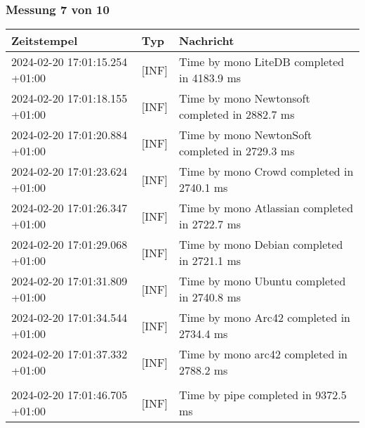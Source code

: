     \subsubsection*{Messung 7 von 10} \label{subsubsec:LiteDbWenigerPaketeAlsDb7von10}
        {
            {\small
                \begin{tabularx}{\textwidth}{|l|l|X|}
                    \hline
                    \textbf{Zeitstempel} & \textbf{Typ} & \textbf{Nachricht} \\
                    \hline
                    \endhead
                    2024-02-20 17:01:15.254 +01:00 & [INF] & Time by mono LiteDB completed in 4183.9 ms \\
                    2024-02-20 17:01:18.155 +01:00 & [INF] & Time by mono Newtonsoft completed in 2882.7 ms \\
                    2024-02-20 17:01:20.884 +01:00 & [INF] & Time by mono NewtonSoft completed in 2729.3 ms \\
                    2024-02-20 17:01:23.624 +01:00 & [INF] & Time by mono Crowd completed in 2740.1 ms \\
                    2024-02-20 17:01:26.347 +01:00 & [INF] & Time by mono Atlassian completed in 2722.7 ms \\
                    2024-02-20 17:01:29.068 +01:00 & [INF] & Time by mono Debian completed in 2721.1 ms \\
                    2024-02-20 17:01:31.809 +01:00 & [INF] & Time by mono Ubuntu completed in 2740.8 ms \\
                    2024-02-20 17:01:34.544 +01:00 & [INF] & Time by mono Arc42 completed in 2734.4 ms \\
                    2024-02-20 17:01:37.332 +01:00 & [INF] & Time by mono arc42 completed in 2788.2 ms \\
                    & & \\
                    2024-02-20 17:01:46.705 +01:00 & [INF] & Time by pipe completed in 9372.5 ms \\
                    \hline
                \end{tabularx}
            }
        }

